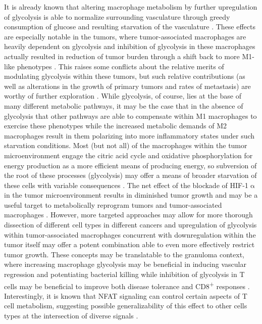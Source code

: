 It is already known that altering macrophage metabolism by further upregulation of glycolysis is able to normalize surrounding vasculature through greedy consumption of glucose and resulting starvation of the vasculature \citep{Wenes2016}. These effects are especially notable in the tumors, where tumor\hyp{}associated macrophages are heavily dependent on glycolysis and inhibition of glycolysis in these macrophages actually resulted in reduction of tumor burden through a shift back to more M1\hyp{}like phenotypes \citep{Mehla2019, Rabold2017}. This raises some conflicts about the relative merits of modulating glycolysis within these tumors, but such relative contributions (as well as alterations in the growth of primary tumors and rates of metastasis) are worthy of further exploration \citep{Mojsilovic2021}. While glycolysis, of course, lies at the base of many different metabolic pathways, it may be the case that in the absence of glycolysis that other pathways are able to compensate within M1 macrophages to exercise these phenotypes while the increased metabolic demands of M2 macrophages result in them polarizing into more inflammatory states under such starvation conditions. Most (but not all) of the macrophages within the tumor microenvironment engage the citric acid cycle and oxidative phosphorylation for energy production as a more efficient means of producing energy, so subversion of the root of these processes (glycolysis) may offer a means of broader starvation of these cells with variable consequences \citep{Geeraerts2021, Yu2020, Puthenveetil2020}. The net effect of the blockade of HIF\hyp{}1$\upalpha$ in the tumor microenvironment results in diminished tumor growth and may be a useful target to metabolically reprogram tumors and tumor\hyp{}associated macrophages \citep{Hong2004}. However, more targeted approaches may allow for more thorough dissection of different cell types in different cancers and upregulation of glycolysis within tumor\hyp{}associated macrophages concurrent with downregulation within the tumor itself may offer a potent combination able to even more effectively restrict tumor growth. These concepts may be translatable to the granuloma context, where increasing macrophage glycolysis may be beneficial in inducing vascular regression and potentiating bacterial killing while inhibition of glycolysis in T cells may be beneficial to improve both disease tolerance and CD8\textsuperscript{+} responses \citep{Phan2017, Russell2019b, Tzelepis2018, Wik2022}. Interestingly, it is known that NFAT signaling can control certain aspects of T cell metabolism, suggesting possible generalizability of this effect to other cells types at the intersection of diverse signals \citep{Vaeth2018}.

